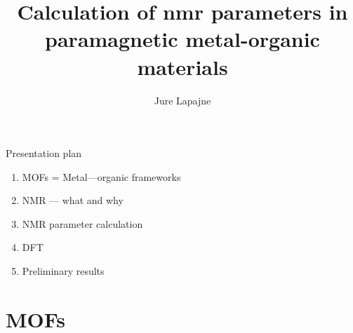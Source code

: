 \documentclass[slovene, usenames,dvipsnames]{beamer}
\author{Jure Lapajne}
\title{Calculation of nmr parameters in paramagnetic metal-organic materials}
\begin{document}
\titlepage

\begin{frame}{Presentation plan}
  \begin{enumerate}
  \item MOFs = Metal---organic frameworks \pause
  \item NMR --- what and why \pause
  \item NMR parameter calculation \pause
  \item DFT \pause
  \item Preliminary results
  \end{enumerate}
\end{frame}

\section{MOFs}
\end{document}
